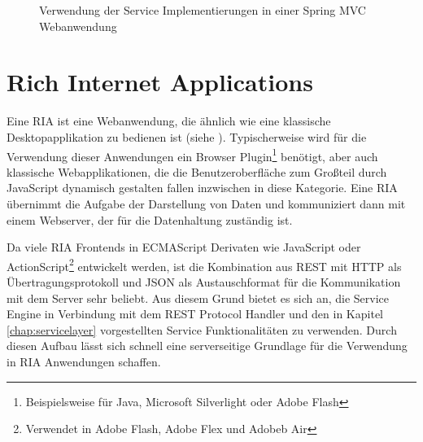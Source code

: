 \begin{figure}
    \caption{Verwendung der Service Implementierungen in einer Spring MVC
    Webanwendung}
	\label{ill:springmvc}
\end{figure}

\pagebreak
\section{Rich Internet Applications}
Eine \ac{RIA} ist eine Webanwendung, die ähnlich wie eine klassische
Desktopapplikation zu bedienen ist (siehe \cite{wiki:ria}). Typischerweise wird
für die Verwendung dieser Anwendungen ein Browser Plugin\footnote{Beispielsweise
für Java, Microsoft Silverlight oder Adobe Flash} benötigt, aber auch klassische
Webapplikationen, die die Benutzeroberfläche zum Großteil durch JavaScript
dynamisch gestalten fallen inzwischen in diese Kategorie. Eine \ac{RIA}
übernimmt die Aufgabe der Darstellung von Daten und kommuniziert dann mit einem
Webserver, der für die Datenhaltung zuständig ist.
 
Da viele \ac{RIA} Frontends in ECMAScript Derivaten wie JavaScript oder
ActionScript\footnote{Verwendet in Adobe Flash, Adobe Flex und Adobeb Air}
entwickelt werden, ist die Kombination aus \ac{REST} mit \ac{HTTP} als
Übertragungsprotokoll und \ac{JSON} als Austauschformat für die Kommunikation mit
dem Server sehr beliebt. Aus diesem Grund bietet es sich an, die Service Engine
in Verbindung mit dem \ac{REST} Protocol Handler und den in Kapitel
\ref{chap:servicelayer} vorgestellten Service Funktionalitäten zu verwenden.
Durch diesen Aufbau lässt sich schnell eine serverseitige Grundlage für die
Verwendung in \ac{RIA} Anwendungen schaffen.

